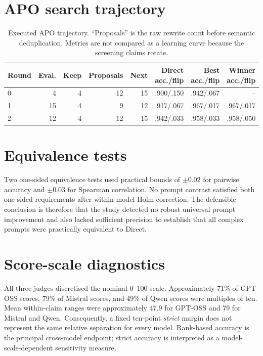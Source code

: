 \documentclass[11pt,twoside,a4paper]{report}
\begin{document}
\section{APO search trajectory}

\begin{table}[htbp]
\centering
\caption{Executed APO trajectory.  ``Proposals'' is the raw rewrite count before
semantic deduplication.  Metrics are not compared as a learning curve because the
screening claims rotate.}
\label{tab:apo-search-trajectory}
\begin{tabular}{lrrrrrrr}
\toprule
Round & Eval. & Keep & Proposals & Next & Direct acc./flip & Best acc./flip & Winner acc./flip \\
\midrule
0 & 4 & 4 & 12 & 15 & .900/.150 & .942/.067 & -- \\
1 & 15 & 4 & 9 & 12 & .917/.067 & .967/.017 & .967/.017 \\
2 & 12 & 4 & 12 & 15 & .942/.033 & .958/.033 & .958/.050 \\
\bottomrule
\end{tabular}
\end{table}

\section{Equivalence tests}

Two one-sided equivalence tests used practical bounds of $\pm0.02$ for pairwise
accuracy and $\pm0.03$ for Spearman correlation.  No prompt contrast satisfied
both one-sided requirements after within-model Holm correction.  The defensible
conclusion is therefore that the study detected no robust universal prompt
improvement and also lacked sufficient precision to establish that all complex
prompts were practically equivalent to Direct.

\section{Score-scale diagnostics}

All three judges discretised the nominal 0--100 scale.  Approximately 71\% of
GPT-OSS scores, 79\% of Mistral scores, and 49\% of Qwen scores were multiples
of ten.  Mean within-claim ranges were approximately 47.9 for GPT-OSS and 79
for Mistral and Qwen.  Consequently, a fixed ten-point \emph{strict} margin does
not represent the same relative separation for every model.  Rank-based
accuracy is the principal cross-model endpoint; strict accuracy is interpreted
as a model-scale-dependent sensitivity measure.
\end{document}
